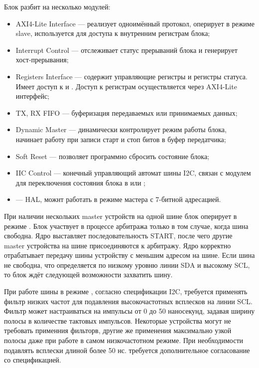 Блок разбит на несколько модулей:
\begin{itemize}
  \item AXI4-Lite Interface --- реализует одноимённый протокол, оперирует в режиме slave, используется
    для доступа к внутренним регистрам блока;
  \item Interrupt Control --- отслеживает статус прерываний блока и генерирует хост-прерывания;
  \item Registers Interface --- содержит управляющие регистры и регистры статуса. Имеет доступ к
     и . Доступ к регистрам осуществляется через AXI4-Lite интерфейс;
  \item TX, RX FIFO --- буферизация передаваемых или принимаемых данных;
  \item Dynamic Master --- динамически контролирует режим работы блока, начинает работу при записи
    старт и стоп битов в буфер передатчика;
  \item Soft Reset --- позволяет программно сбросить состояние блока;
  \item IIC Control --- конечный управляющий автомат шины I2C, связан с модулем  для
    переключения состояния блока в  или ;
  \item {} --- HAL, можнт работать в режиме мастера с 7-битной адресацией.
\end{itemize}

При наличии нескольких master устройств на одной шине блок оперирует в режиме .
Блок участвует в процессе арбитража только в том случае, когда шина свободна. Ядро
выставляет последовательность START, после чего другие master устройства на шине
присоединяются к арбитражу. Ядро корректно отрабатывает передачу шины
устройству с меньшим адресом на шине. Если шина не свободна, что определяется
по низкому уровню линии SDA и высокому SCL, то блок ждёт следующей возможности
захватить шину.

При работе шины в режиме , согласно спецификации I2C, требуется применять
фильтр низких частот для подавления высокочастотных всплесков на линии SCL. Фильтр
может настраиваться на импульсы от 0 до 50 наносекунд, задавая ширину полосы
в количестве тактовых импульсов. Некоторые устройства могут не требовать применния фильторв,
другие же применения максимально узкой полосы даже при работе в самом низкочастотном режиме.
При необходимости подавлять всплески длиной более 50 нс. требуется дополнительное согласование
со спецификацией.

